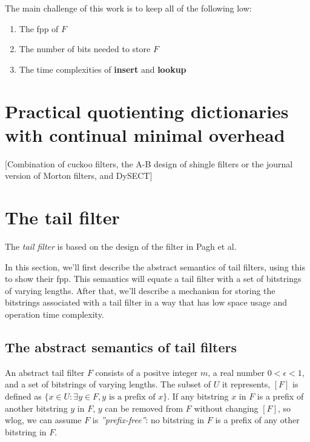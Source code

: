 \documentclass[11pt,letterpaper]{article}
\begin{document}
The main challenge of this work is to keep all of the following low:

\begin{enumerate}
\item The fpp of $F$
\item The number of bits needed to store $F$
\item The time complexities of {\bf insert} and {\bf lookup}
\end{enumerate}

\section{Practical quotienting dictionaries with continual minimal overhead}

[Combination of cuckoo filters, the A-B design of shingle filters or the journal version of Morton filters, and DySECT]

\section{The tail filter}

The {\em tail filter} is based on the design of the filter in Pagh et al.~\cite{DBLP:journals/corr/abs-1304-1188}

In this section, we'll first describe the abstract semantics of tail filters, using this to show their fpp.
This semantics will equate a tail filter with a set of bitstrings of varying lengths.
After that, we'll describe a mechanism for storing the bitstrings associated with a tail filter in a way that has low space usage and operation time complexity.

\subsection{The abstract semantics of tail filters}

An abstract tail filter $F$ consists of a positve integer $m$, a real number $0 < \epsilon < 1$, and a set of bitstrings of varying lengths. %
The subset of $U$ it represents, $[F]$ is defined as $\{x \in U : \exists y \in F, y \textrm{ is a prefix of } x\}$.
If any bitstring $x$ in $F$ is a prefix of another bitstring $y$ in $F$, $y$ can be removed from $F$ without changing $[F]$, so wlog, we can assume $F$ is {\em ''prefix-free''}: no bitstring in $F$ is a prefix of any other bitstring in $F$.
\end{document}
